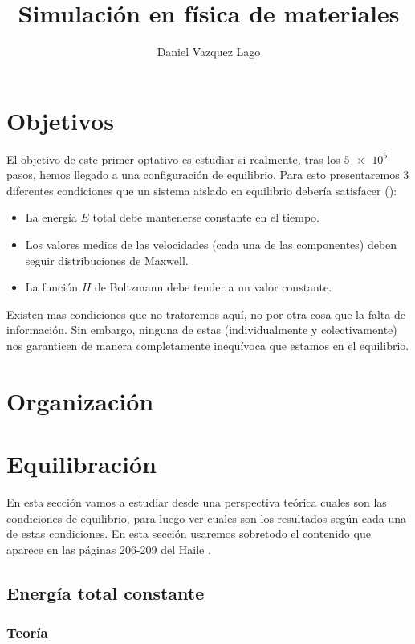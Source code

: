 \documentclass[11pt]{article} %
\author{Daniel Vazquez Lago}
\title{Simulación en física de materiales}
\begin{document}
	
	
\maketitle
\newpage
\tableofcontents
\section{Objetivos}
	
El objetivo de este primer optativo es estudiar si realmente, tras los $\num{5e5}$ pasos, hemos llegado a una configuración de equilibrio. Para esto presentaremos 3 diferentes condiciones que un sistema aislado en equilibrio debería satisfacer (\cite{Haile}):

\begin{itemize}
 	\item La energía $E$ total debe mantenerse constante en el tiempo.
 	\item Los valores medios de las velocidades (cada una de las componentes) deben seguir distribuciones de Maxwell.
 	\item La función $H$ de Boltzmann debe tender a un valor constante. 	
\end{itemize}
Existen mas condiciones que no trataremos aquí, no por otra cosa que la falta de información. Sin embargo, ninguna de estas (individualmente y colectivamente) nos garanticen de manera completamente inequívoca que estamos en el equilibrio.
	
\section{Organización}
	
\section{Equilibración}

En esta sección vamos a estudiar desde una perspectiva teórica cuales son las condiciones de equilibrio, para luego ver cuales son los resultados según cada una de estas condiciones. En esta sección usaremos sobretodo el contenido que aparece en las páginas 206-209 del Haile \cite{Haile}. 

\subsection{Energía total constante}

\subsubsection{Teoría}
\end{document}
